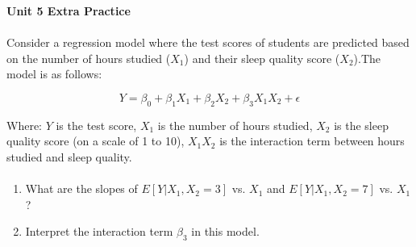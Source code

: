 \textbf{Unit 5 Extra Practice}  
\paragraph{}
Consider a regression model where the test scores of students are predicted based on the number of hours studied (\(X_1\)) and their sleep quality score (\(X_2\)).The model is as follows:

\[
Y = \beta_0 + \beta_1 X_1 + \beta_2 X_2 + \beta_3 X_1 X_2 + \epsilon
\]

Where:  
 \(Y\) is the test score,  
 \(X_1\) is the number of hours studied,  
 \(X_2\) is the sleep quality score (on a scale of 1 to 10),  
 \(X_1 X_2\) is the interaction term between hours studied and sleep quality.
\paragraph{}
 
\begin{enumerate}
  \item[(a)] What are the slopes of \( E[Y | X_1, X_2 = 3] \) vs. \( X_1 \) and \( E[Y | X_1, X_2 = 7] \) vs. \( X_1 \)?  
  \item[(b)] Interpret the interaction term \( \beta_3 \) in this model.
\end{enumerate}



 






